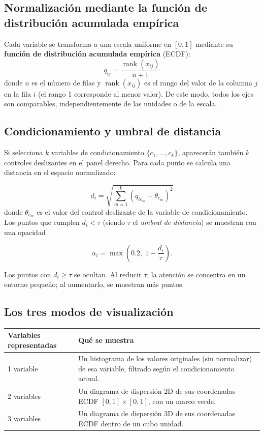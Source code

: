 \documentclass[11pt,a4paper]{article}
\begin{document}
\subsection{Normalización mediante la función de distribución acumulada empírica}

Cada variable se transforma a una escala uniforme en $[0,1]$ mediante su \textbf{función de distribución acumulada empírica} (ECDF):
\begin{equation}
  q_{ij} = \frac{\operatorname{rank}(x_{ij})}{n+1}
\end{equation}
donde $n$ es el número de filas y $\operatorname{rank}(x_{ij})$ es el rango del valor de la columna $j$ en la fila $i$ (el rango 1 corresponde al menor valor). De este modo, todos los ejes son comparables, independientemente de las unidades o de la escala.

\subsection{Condicionamiento y umbral de distancia}

Si selecciona $k$ variables de condicionamiento $\{c_1,\dots,c_k\}$, aparecerán también $k$ controles deslizantes en el panel derecho. Para cada punto se calcula una distancia en el espacio normalizado:

\begin{equation}
  d_i = \sqrt{\sum_{m=1}^{k} \left(q_{i c_m} - \theta_{c_m}\right)^2}
\end{equation}
donde $\theta_{c_m}$ es el valor del control deslizante de la variable de condicionamiento. Los puntos que cumplen $d_i < \tau$ (siendo $\tau$ el \emph{umbral de distancia}) se muestran con una opacidad

\begin{equation}
  \alpha_i = \max\left(0.2,\; 1 - \frac{d_i}{\tau}\right).
\end{equation}

Los puntos con $d_i \ge \tau$ se ocultan. Al reducir $\tau$, la atención se concentra en un entorno pequeño; al aumentarlo, se muestran más puntos.

\subsection{Los tres modos de visualización}

\begin{center}
\begin{tabularx}{\textwidth}{lX}
\toprule
\textbf{Variables representadas} & \textbf{Qué se muestra} \\
\midrule
1 variable & Un histograma de los valores originales (sin normalizar) de esa variable, filtrado según el condicionamiento actual. \\
2 variables & Un diagrama de dispersión 2D de sus coordenadas ECDF $[0,1]\times[0,1]$, con un marco verde. \\
3 variables & Un diagrama de dispersión 3D de sus coordenadas ECDF dentro de un cubo unidad. \\
\bottomrule
\end{tabularx}
\end{center}
\end{document}
